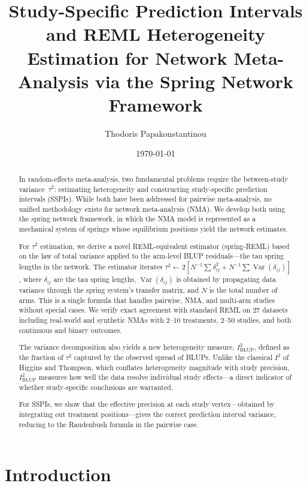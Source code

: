 \documentclass[12pt]{article}
\title{Study-Specific Prediction Intervals and REML Heterogeneity Estimation for Network Meta-Analysis via the Spring Network Framework}
\author{Thodoris Papakonstantinou}
\date{\today}
\newcommand{\Var}{\operatorname{Var}}
\begin{document}
\maketitle

\begin{abstract}
In random-effects meta-analysis, two fundamental problems require the
between-study variance~$\tau^2$: estimating heterogeneity and
constructing study-specific prediction intervals (SSPIs).  While both
have been addressed for pairwise meta-analysis, no unified methodology
exists for network meta-analysis (NMA).  We develop both using the
spring network framework, in which the NMA model is represented as a
mechanical system of springs whose equilibrium positions yield the
network estimates.

For $\tau^2$ estimation, we derive a novel REML-equivalent estimator
(spring-REML) based on the law of total variance applied to the
arm-level BLUP residuals---the tau spring lengths in the network.  The
estimator iterates
$\tau^2 \leftarrow 2[N^{-1} \sum \delta_{ij}^2 + N^{-1} \sum \Var(\delta_{ij})]$,
where $\delta_{ij}$ are the tau spring lengths, $\Var(\delta_{ij})$ is
obtained by propagating data variance through the spring system's
transfer matrix, and $N$ is the total number of arms.  This is a single
formula that handles pairwise, NMA, and multi-arm studies without
special cases.  We verify exact agreement with standard REML on 27
datasets including real-world and synthetic NMAs with 2--10 treatments,
2--50 studies, and both continuous and binary outcomes.

The variance decomposition also yields a new heterogeneity measure,
$I^2_{\mathrm{BLUP}}$, defined as the fraction of $\tau^2$ captured by
the observed spread of BLUPs.  Unlike the classical $I^2$ of Higgins
and Thompson, which conflates heterogeneity magnitude with study
precision, $I^2_{\mathrm{BLUP}}$ measures how well the data resolve
individual study effects---a direct indicator of whether
study-specific conclusions are warranted.

For SSPIs, we show that the effective precision at each study
vertex---obtained by integrating out treatment positions---gives the
correct prediction interval variance, reducing to the Raudenbush formula
in the pairwise case.
\end{abstract}

\section{Introduction}
\end{document}
